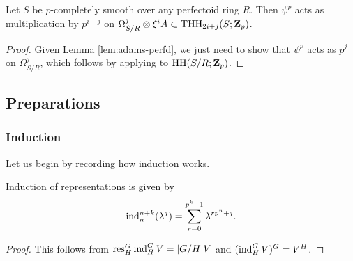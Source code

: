 \begin{lemma}
  \label{lem:adams-smooth}
  Let $S$ be $p$-completely smooth over any perfectoid ring $R$. Then $\psi^p$ acts as multiplication by $p^{i+j}$ on $\Omega^j_{S/R} \otimes \xi^i A \subset \mathrm{THH}_{2i+j}(S;\mathbf Z_p)$.
\end{lemma}
\begin{proof}
  Given Lemma \ref{lem:adams-perfd}, we just need to show that $\psi^p$ acts as $p^j$ on $\Omega^j_{S/R}$, which follows by applying \cite[Proposition 6.4.12]{RaksitDDR} to $\mathrm{HH}(S/R;\mathbf Z_p)$.
\end{proof}

\iffalse
\subsection{Preparations}
\label{sub:prep}

\subsubsection{Induction}
Let us begin by recording how induction works.

\begin{proposition}
  \label{prop:ind-int}
  Induction of representations is given by
  \[ \operatorname{ind}^{n+k}_n(\lambda^j) = \sum_{r=0}^{p^k-1} \lambda^{rp^n+j}. \]
\end{proposition}
\begin{proof}
  This follows from $\operatorname{res}^G_H \operatorname{ind}^G_H V = |G/H|V$ and $(\operatorname{ind}^G_H V)^G = V^H$.
\end{proof}

